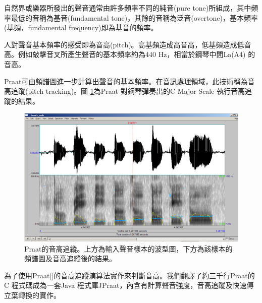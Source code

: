 \documentclass[12pt,a4paper,oneside]{report}
\begin{document}
自然界或樂器所發出的聲音通常由許多頻率不同的純音(pure tone)所組成，其中頻率最低的音稱為基音(fundamental tone)，其餘的音稱為泛音(overtone)，基本頻率(基頻，fundamental frequency)即為基音的頻率。

人對聲音基本頻率的感受即為音高(pitch)。高基頻造成高音高，低基頻造成低音高。例如敲擊音叉所產生聲音的基本頻率約為440 Hz，相當於鋼琴中間La(A4) 的音高。

Praat可由頻譜圖進一步計算出聲音的基本頻率。在音訊處理領域，此技術稱為音高追蹤(pitch tracking)。圖 \ref{fig:pitch_tracking}為Praat 對鋼琴彈奏出的C Major Scale 執行音高追蹤的結果。


\begin{figure}[htb]
\centering
\includegraphics[scale=1.0]{img/pitch_tracking.png}
\caption{ Praat的音高追縱。上方為輸入聲音樣本的波型圖，下方為該樣本的頻譜圖及音高追縱後的結果。 }
\label{fig:pitch_tracking}
\end{figure}


為了使用Praat[]的音高追蹤演算法實作來判斷音高。我們翻譯了約三千行Praat的C 程式碼成為一套Java 程式庫JPraat，內含有計算聲音強度，音高追蹤及快速傅立葉轉換的實作。


\end{document}
